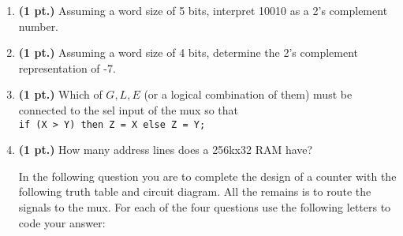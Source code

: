 \documentclass{article}
\begin{document}
\begin{enumerate}
\item {\bf (1 pt.)} Assuming a word size of 5 bits, interpret 10010 as a 2's complement
number.

\item {\bf (1 pt.)} Assuming a word size of 4 bits, determine the 2's complement
representation of -7.

\item {\bf (1 pt.)} Which of $G,L,E$ (or a logical combination of them) 
must be connected to the sel input of the mux so that \\
\verb+if (X > Y) then Z = X else Z = Y;+



\item {\bf (1 pt.)} How many address lines does a 256kx32 RAM have?

\pagebreak
In the following question you are to complete the design of a counter with
the following truth table and circuit diagram.  All the remains is to route
the signals to the mux.  For each of the four questions use the following
letters to code your answer:


\end{enumerate}
\end{document}
